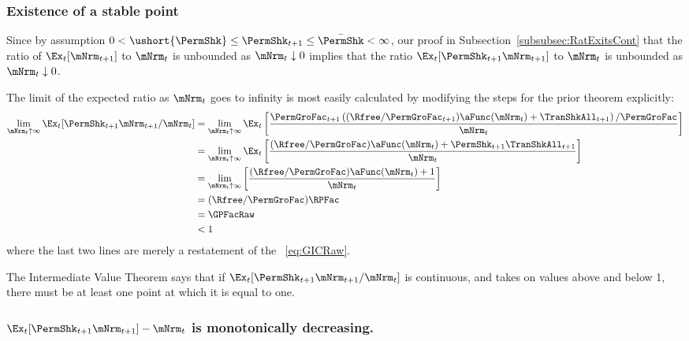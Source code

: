 \documentclass[\econtexRoot/BufferStockTheory]{subfiles}
\begin{document}
\subsubsection{Existence of a stable point}

Since by assumption $ 0 < \ushort{\PermShk} \leq \PermShk_{t+1} \leq \bar{\PermShk} < \infty$, our proof in Subsection~\ref{subsubsec:RatExitsCont} that the ratio of $\Ex_{t}[\mNrm_{t+1}]$ to $\mNrm_{t}$ is unbounded as $\mNrm_{t} \downarrow 0$ implies that the ratio $\Ex_{t}[\PermShk_{t+1}\mNrm_{t+1}]$ to $\mNrm_{t}$ is unbounded as $\mNrm_{t} \downarrow 0$.

The limit of the expected ratio as $\mNrm_{t}$ goes to infinity is most easily calculated by modifying the steps for the prior theorem explicitly:
\begin{align}
  \lim_{\mNrm_{t} \uparrow \infty} \Ex_{t}[\PermShk_{t+1}\mNrm_{t+1}/\mNrm_{t}]  & =   
                                                                  \lim_{\mNrm_{t} \uparrow \infty} 
                                                                  \Ex_{t}\left[\frac{\PermGroFac_{t+1}\left((\Rfree/\PermGroFac_{t+1})\aFunc(\mNrm_{t})+{\TranShkAll}_{t+1}\right)/\PermGroFac}{\mNrm_{t}}\right] \notag 
  \\   & =   \lim_{\mNrm_{t} \uparrow \infty} \Ex_{t}\left[
         \frac{(\Rfree/\PermGroFac)\aFunc(\mNrm_{t})+\PermShk_{t+1}{\TranShkAll}_{t+1}}{\mNrm_{t}}
         \right] \notag 
  \\   & =   \lim_{\mNrm_{t} \uparrow \infty} \left[
         \frac{(\Rfree/\PermGroFac)\aFunc(\mNrm_{t})+1}{\mNrm_{t}}
         \right] \notag 
  \\  & = (\Rfree/\PermGroFac)\RPFac \label{eq:emgro2}
  \\  & = \GPFacRaw \notag
  \\  & < 1 \notag
\end{align}
where the last two lines are merely a restatement of the \GICRaw~\eqref{eq:GICRaw}.

The Intermediate Value Theorem says that if $\Ex_{t}[\PermShk_{t+1}\mNrm_{t+1}/\mNrm_t]$ is continuous, and takes on values above and below 1, there must be at least one point at which it is equal to one.

\subsubsection{\texorpdfstring{$\Ex_{t}[\PermShk_{t+1}\mNrm_{t+1}] -\mNrm_t$}{PermShk m{t+1} --- m{t}} is monotonically decreasing.}
\end{document}
